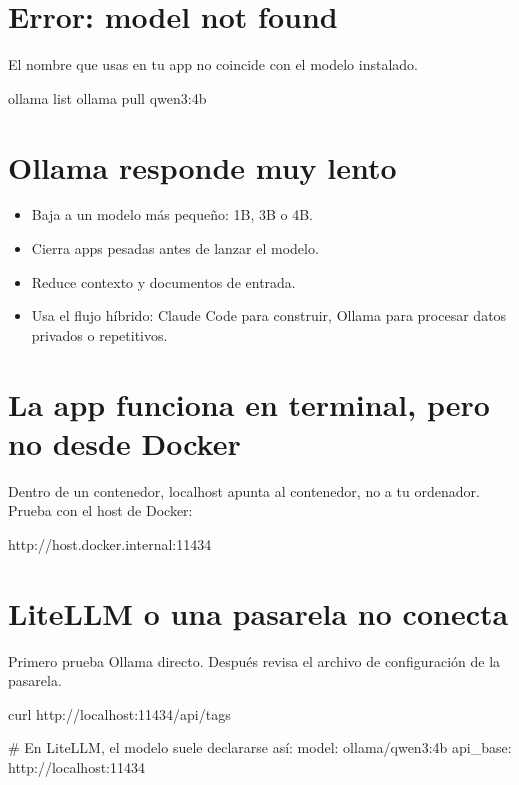 \documentclass[11pt,a4paper]{book}
\begin{document}
\section{Error: model not found}
El nombre que usas en tu app no coincide con el modelo instalado.

\begin{codebox}
ollama list
ollama pull qwen3:4b
\end{codebox}
\section{Ollama responde muy lento}
\begin{itemize}\item Baja a un modelo más pequeño: 1B, 3B o 4B.\end{itemize}
\begin{itemize}\item Cierra apps pesadas antes de lanzar el modelo.\end{itemize}
\begin{itemize}\item Reduce contexto y documentos de entrada.\end{itemize}
\begin{itemize}\item Usa el flujo híbrido: Claude Code para construir, Ollama para procesar datos privados o repetitivos.\end{itemize}
\section{La app funciona en terminal, pero no desde Docker}
Dentro de un contenedor, localhost apunta al contenedor, no a tu ordenador. Prueba con el host de Docker:

\begin{codebox}
http://host.docker.internal:11434
\end{codebox}
\section{LiteLLM o una pasarela no conecta}
Primero prueba Ollama directo. Después revisa el archivo de configuración de la pasarela.

\begin{codebox}
curl http://localhost:11434/api/tags

# En LiteLLM, el modelo suele declararse así:
model: ollama/qwen3:4b
api_base: http://localhost:11434
\end{codebox}
\end{document}
